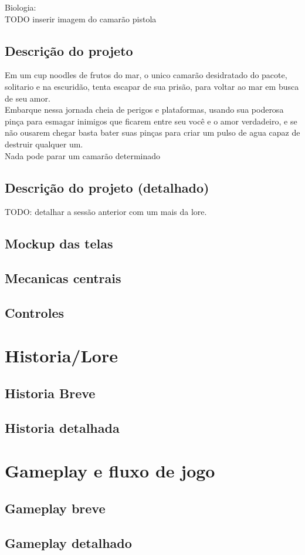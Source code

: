 Biologia:\\
TODO inserir imagem do camarão pistola\

    \subsection{Descrição do projeto}%
Em um cup noodles de frutos do mar, o unico camarão desidratado do pacote, solitario e na escuridão, tenta escapar de sua prisão, para voltar ao mar em busca de seu amor.\\
Embarque nessa jornada cheia de perigos e plataformas, usando sua poderosa pinça para esmagar inimigos que ficarem entre seu você e o amor verdadeiro, e se não ousarem chegar basta bater suas pinças para criar um pulso de agua capaz de destruir qualquer um.\\
Nada pode parar um camarão determinado\\
    \subsection{Descrição do projeto (detalhado)}%
TODO: detalhar a sessão anterior com um mais da lore.\\
    \subsection{Mockup das telas}%
    \subsection{Mecanicas centrais}%
    \subsection{Controles}%
    
\section{Historia/Lore}%
    \subsection{Historia Breve}%
    \subsection{Historia detalhada}%

\section{Gameplay e fluxo de jogo}%
    \subsection{Gameplay breve}%
    \subsection{Gameplay detalhado}%


